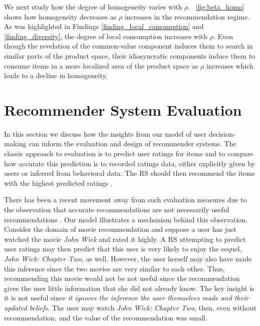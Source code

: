 \documentclass[manuscript, nonacm]{acmart}
\begin{document}
We next study how the degree of homogeneity varies with $\rho$. ~\autoref{fig:beta_homo} shows how homogeneity decreases as $\rho$ increases in the recommendation regime. As was highlighted in Findings \ref{finding_local_consumption} and \ref{finding_diversity}, the degree of local consumption increases with $\rho$. Even though the revelation of the common-value component induces them to search in similar parts of the product space, their idiosyncratic components induce them to consume items in a more localized area of the product space as $\rho$ increases which leads to a decline in homogeneity.

\section{Recommender System Evaluation}
In this section we discuss how the insights from our model of user decision-making can inform the evaluation and design of recommender systems. The classic approach to evaluation is to predict user ratings for items and to compare how accurate this prediction is to recorded ratings data, either explicitly given by users or inferred from behavioral data. The RS should then recommend the items with the highest predicted ratings \cite{adomavicius2005toward}.
\par
There has been a recent movement away from such evaluation measures due to the observation that accurate recommendations are not necessarily useful recommendations \cite{mcnee2006being}. Our model illustrates a mechanism behind this observation. Consider the domain of movie recommendation and suppose a user has just watched the movie \textit{John Wick} and rated it highly. A RS attempting to predict user ratings may then predict that this user is very likely to enjoy the sequel, \textit{John Wick: Chapter Two}, as well. However, the user herself may also have made this inference since the two movies are very similar to each other. Thus, recommending this movie would not be not useful since the recommendation gives the user little information that she did not already know. The key insight is it is not useful since \textit{it ignores the inference the user themselves made and their updated beliefs}. The user may watch \textit{John Wick: Chapter Two}, then, even without recommendation, and the value of the recommendation was small.
\par
\end{document}
